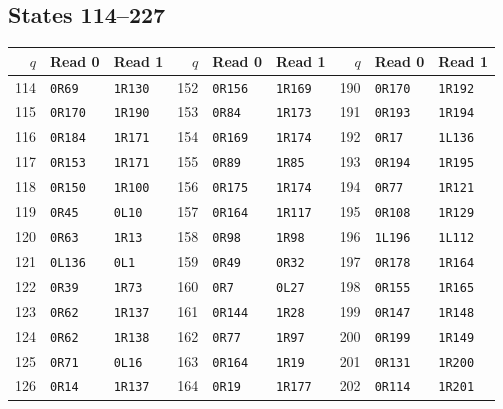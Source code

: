 \subsection*{States 114--227}
\begin{center}\small
\setlength{\tabcolsep}{8pt}
\renewcommand{\arraystretch}{1.16}
\begin{tabular}{rll@{\hspace{9mm}}rll@{\hspace{9mm}}rll}
\toprule
$q$ & Read 0 & Read 1 & $q$ & Read 0 & Read 1 & $q$ & Read 0 & Read 1 \\
\midrule
114 & \texttt{0R69} & \texttt{1R130} & 152 & \texttt{0R156} & \texttt{1R169} & 190 & \texttt{0R170} & \texttt{1R192} \\
115 & \texttt{0R170} & \texttt{1R190} & 153 & \texttt{0R84} & \texttt{1R173} & 191 & \texttt{0R193} & \texttt{1R194} \\
116 & \texttt{0R184} & \texttt{1R171} & 154 & \texttt{0R169} & \texttt{1R174} & 192 & \texttt{0R17} & \texttt{1L136} \\
117 & \texttt{0R153} & \texttt{1R171} & 155 & \texttt{0R89} & \texttt{1R85} & 193 & \texttt{0R194} & \texttt{1R195} \\
118 & \texttt{0R150} & \texttt{1R100} & 156 & \texttt{0R175} & \texttt{1R174} & 194 & \texttt{0R77} & \texttt{1R121} \\
119 & \texttt{0R45} & \texttt{0L10} & 157 & \texttt{0R164} & \texttt{1R117} & 195 & \texttt{0R108} & \texttt{1R129} \\
120 & \texttt{0R63} & \texttt{1R13} & 158 & \texttt{0R98} & \texttt{1R98} & 196 & \texttt{1L196} & \texttt{1L112} \\
121 & \texttt{0L136} & \texttt{0L1} & 159 & \texttt{0R49} & \texttt{0R32} & 197 & \texttt{0R178} & \texttt{1R164} \\
122 & \texttt{0R39} & \texttt{1R73} & 160 & \texttt{0R7} & \texttt{0L27} & 198 & \texttt{0R155} & \texttt{1R165} \\
123 & \texttt{0R62} & \texttt{1R137} & 161 & \texttt{0R144} & \texttt{1R28} & 199 & \texttt{0R147} & \texttt{1R148} \\
124 & \texttt{0R62} & \texttt{1R138} & 162 & \texttt{0R77} & \texttt{1R97} & 200 & \texttt{0R199} & \texttt{1R149} \\
125 & \texttt{0R71} & \texttt{0L16} & 163 & \texttt{0R164} & \texttt{1R19} & 201 & \texttt{0R131} & \texttt{1R200} \\
126 & \texttt{0R14} & \texttt{1R137} & 164 & \texttt{0R19} & \texttt{1R177} & 202 & \texttt{0R114} & \texttt{1R201} \\

\end{tabular}
\end{center}
